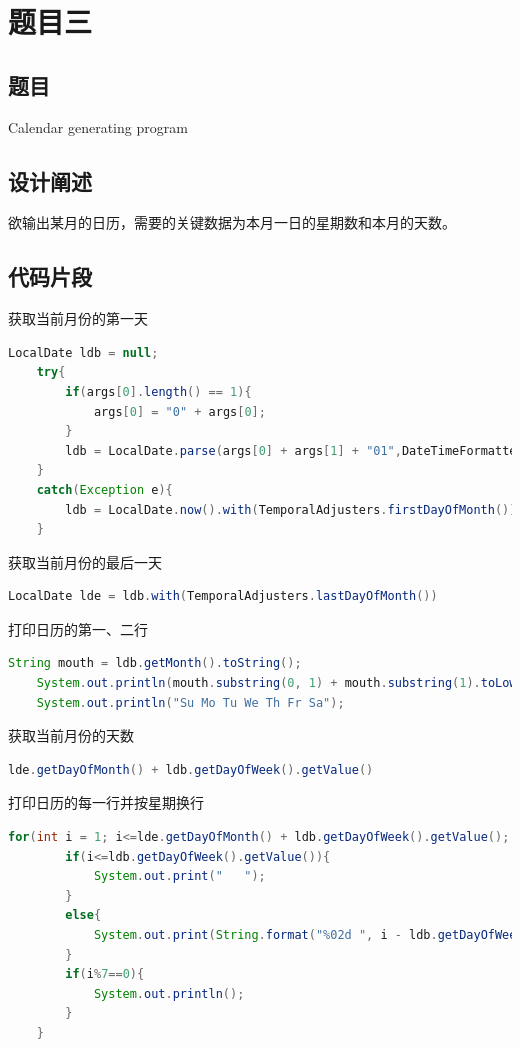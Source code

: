 \documentclass[a4paper]{article}
\begin{document}
\section{题目三}
\subsection{题目}
Calendar generating program
\subsection{设计阐述}
欲输出某月的日历，需要的关键数据为本月一日的星期数和本月的天数。\\

\subsection{代码片段}
获取当前月份的第一天

\begin{lstlisting}[language=Java]
    LocalDate ldb = null;
    try{
        if(args[0].length() == 1){
            args[0] = "0" + args[0];
        }
        ldb = LocalDate.parse(args[0] + args[1] + "01",DateTimeFormatter.ofPattern("MMyyyydd"));
    }
    catch(Exception e){
        ldb = LocalDate.now().with(TemporalAdjusters.firstDayOfMonth());
    }
\end{lstlisting}

获取当前月份的最后一天

\begin{lstlisting}[language=Java]
    LocalDate lde = ldb.with(TemporalAdjusters.lastDayOfMonth())
\end{lstlisting}

打印日历的第一、二行

\begin{lstlisting}[language=Java]
    String mouth = ldb.getMonth().toString();
    System.out.println(mouth.substring(0, 1) + mouth.substring(1).toLowerCase() + " " + Integer.toString(ldb.getYear()));
    System.out.println("Su Mo Tu We Th Fr Sa");
\end{lstlisting}

获取当前月份的天数

\begin{lstlisting}[language=Java]
    lde.getDayOfMonth() + ldb.getDayOfWeek().getValue()
\end{lstlisting}

打印日历的每一行并按星期换行

\begin{lstlisting}[language=Java]
    for(int i = 1; i<=lde.getDayOfMonth() + ldb.getDayOfWeek().getValue(); i++){
        if(i<=ldb.getDayOfWeek().getValue()){
            System.out.print("   ");
        }
        else{
            System.out.print(String.format("%02d ", i - ldb.getDayOfWeek().getValue()));
        }
        if(i%7==0){
            System.out.println();
        }
    }
\end{lstlisting}
\end{document}
